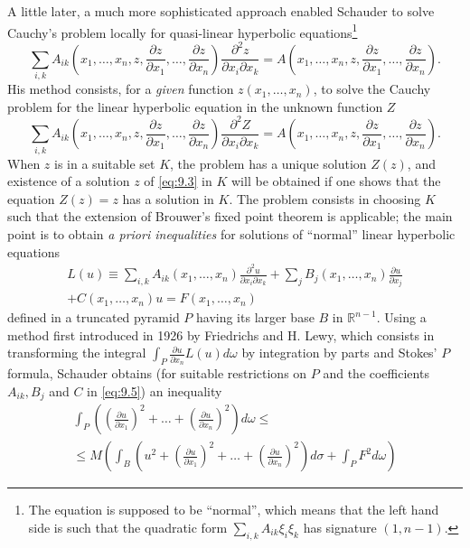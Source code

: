 \documentclass[12pt,a4paper,leqno,twoside]{extbook}
\newcommand{\R}{\mathbb{R}}
\newcommand{\pder}[2]{\frac{\partial #1}{\partial #2}}
\begin{document}
A little later, a much more sophisticated approach enabled Schauder to solve Cauchy's problem locally for quasi-linear hyperbolic equations\footnote{The equation is supposed to be ``normal'', which means that the left hand side is such that the quadratic form \(\sum_{i,k} A_{ik} \xi_i \xi_k\) has signature \((1,n-1)\).}
\begin{equation}
    \label{eq:9.3}
    \sum_{i,k} A_{ik} \left( x_1, \ldots, x_n, z, \pder{z}{x_1}, \ldots, \pder{z}{x_n} \right) \frac{\partial^2 z}{\partial x_i \partial x_k} = A \left( x_1, \ldots, x_n, z, \pder{z}{x_1}, \ldots, \pder{z}{x_n} \right).
\end{equation}
His method consists, for a \emph{given} function \(z(x_1, \ldots, x_n)\), to solve the Cauchy problem for the linear hyperbolic equation in the unknown function \(Z\)
\begin{equation}
    \label{eq:9.4}
    \sum_{i,k} A_{ik} \left( x_1, \ldots, x_n, z, \pder{z}{x_1}, \ldots, \pder{z}{x_n} \right) \frac{\partial^2 Z}{\partial x_i \partial x_k} = A \left( x_1, \ldots, x_n, z, \pder{z}{x_1}, \ldots, \pder{z}{x_n} \right).
\end{equation}
When \(z\) is in a suitable set \(K\), the problem has a unique solution \(Z(z)\), and existence of a solution \(z\) of \eqref{eq:9.3} in \(K\) will be obtained if one shows that the equation \(Z(z) = z\) has a solution in \(K\). The problem consists in choosing \(K\) such that the extension of Brouwer's fixed point theorem is applicable; the main point is to obtain \emph{a priori inequalities} for solutions of ``normal'' linear hyperbolic equations
\begin{equation}
    \label{eq:9.5}
    \begin{gathered}
    L(u) \equiv \sum_{i,k} A_{ik}(x_1, \ldots, x_n) \frac{\partial^2 u}{\partial x_i \partial x_k} + \sum_j B_j(x_1, \ldots, x_n) \pder{u}{x_j} \\
    + C(x_1, \ldots, x_n)u = F(x_1, \ldots, x_n)
    \end{gathered}
\end{equation}
defined in a truncated pyramid \(P\) having its larger base \(B\) in \(\R^{n-1}\). Using a method first introduced in 1926 by Friedrichs and H. Lewy, which consists in transforming the integral \(\int_P \pder{u}{x_n} L(u)d\omega\) by integration by parts and Stokes' \(P\) formula, Schauder obtains (for suitable restrictions on \(P\) and the coefficients \(A_{ik}, B_j\) and \(C\) in \eqref{eq:9.5}) an inequality
\begin{equation}
    \label{eq:9.6}
    \begin{gathered}
    \int_P \left( \left(\pder{u}{x_1}\right)^2 + \ldots + \left(\pder{u}{x_n}\right)^2 \right) d\omega \leq \\
    \leq M \left( \int_B \left( u^2 + \left(\pder{u}{x_1}\right)^2 + \ldots + \left(\pder{u}{x_n}\right)^2 \right) d\sigma + \int_P F^2 d\omega \right)
    \end{gathered}
\end{equation}
\end{document}
